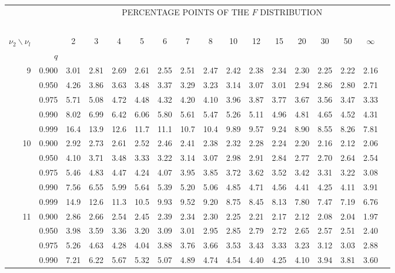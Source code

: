 {\newpage

\thispagestyle{empty}

\begin{center}
\begin{tabular}{rrr@{\,}r@{\,}r@{\,}r@{\,}r@{\,}r@{\,}r@{\,}r
                   @{\,}r@{\,}r@{\,}r@{\,}r@{\,}r@{\,}r@{\,}r}
&&\multicolumn{14}{c}{PERCENTAGE POINTS OF THE $F$ DISTRIBUTION}\\
\ \\
$\nu_2\backslash\nu_l$ & & 
\multicolumn{1}{c}{2} &\multicolumn{1}{c}{3} &
\multicolumn{1}{c}{4} &\multicolumn{1}{c}{5} &
\multicolumn{1}{c}{6} &\multicolumn{1}{c}{7} &
\multicolumn{1}{c}{8} &\multicolumn{1}{c}{10}&
\multicolumn{1}{c}{12}&\multicolumn{1}{c}{15}&
\multicolumn{1}{c}{20}&\multicolumn{1}{c}{30}&
\multicolumn{1}{c}{50}&\multicolumn{1}{c}{$\infty$}\\
& $q$ \\
 9&0.900&3.01&2.81&2.69&2.61&2.55&2.51&2.47&2.42&2.38&2.34&2.30&2.25&2.22&2.16\\
  &0.950&4.26&3.86&3.63&3.48&3.37&3.29&3.23&3.14&3.07&3.01&2.94&2.86&2.80&2.71\\
  &0.975&5.71&5.08&4.72&4.48&4.32&4.20&4.10&3.96&3.87&3.77&3.67&3.56&3.47&3.33\\
  &0.990&8.02&6.99&6.42&6.06&5.80&5.61&5.47&5.26&5.11&4.96&4.81&4.65&4.52&4.31\\
  &0.999&16.4&13.9&12.6&11.7&11.1&10.7&10.4&9.89&9.57&9.24&8.90&8.55&8.26&7.81\\
10&0.900&2.92&2.73&2.61&2.52&2.46&2.41&2.38&2.32&2.28&2.24&2.20&2.16&2.12&2.06\\
  &0.950&4.10&3.71&3.48&3.33&3.22&3.14&3.07&2.98&2.91&2.84&2.77&2.70&2.64&2.54\\
  &0.975&5.46&4.83&4.47&4.24&4.07&3.95&3.85&3.72&3.62&3.52&3.42&3.31&3.22&3.08\\
  &0.990&7.56&6.55&5.99&5.64&5.39&5.20&5.06&4.85&4.71&4.56&4.41&4.25&4.11&3.91\\
  &0.999&14.9&12.6&11.3&10.5&9.93&9.52&9.20&8.75&8.45&8.13&7.80&7.47&7.19&6.76\\
11&0.900&2.86&2.66&2.54&2.45&2.39&2.34&2.30&2.25&2.21&2.17&2.12&2.08&2.04&1.97\\
  &0.950&3.98&3.59&3.36&3.20&3.09&3.01&2.95&2.85&2.79&2.72&2.65&2.57&2.51&2.40\\
  &0.975&5.26&4.63&4.28&4.04&3.88&3.76&3.66&3.53&3.43&3.33&3.23&3.12&3.03&2.88\\
  &0.990&7.21&6.22&5.67&5.32&5.07&4.89&4.74&4.54&4.40&4.25&4.10&3.94&3.81&3.60\\

\end{tabular}
\end{center}}
